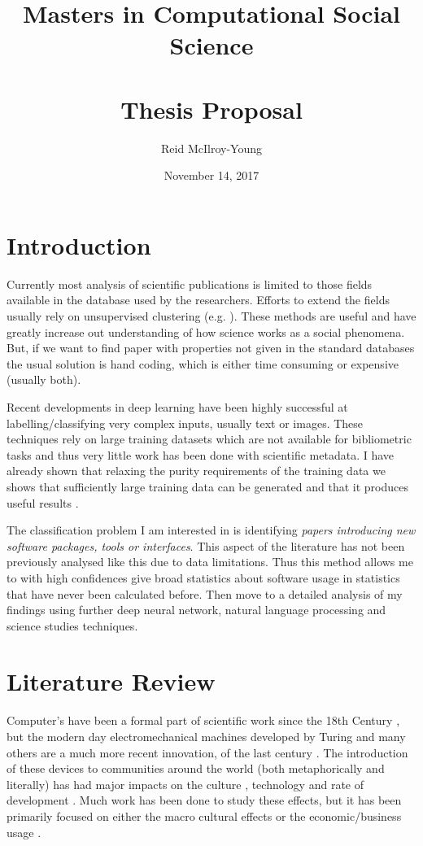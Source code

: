 \documentclass[12pt, a4paper]{article}
\author{Reid McIlroy-Young}
\title{Masters in Computational Social Science\\ \quad \\ \large Thesis Proposal}
\date{November 14, 2017}
\begin{document}
\maketitle
\newpage
{}
\setcounter{page}{1}
\section{Introduction}

Currently most analysis of scientific publications is limited to those fields available in the database used by the researchers. Efforts to extend the fields usually rely on unsupervised clustering (e.g. \cite{Boyack2005}). These methods are useful and have greatly increase out understanding of how science works as a social phenomena. But, if we want to find paper with properties not given in the standard databases the usual solution is hand coding, which is either time consuming or expensive (usually both).

Recent developments in deep learning \citep{karpathy2015deep} have been highly successful at labelling/classifying very complex inputs, usually text or images. These techniques rely on large training datasets which are not available for bibliometric tasks and thus very little work has been done with scientific metadata. I have already shown that relaxing the purity requirements of the training data we shows that sufficiently large training data can be generated and that it produces useful results \citep{mcilroy2017novel}.

The classification problem I am interested in is identifying \textit{papers introducing new software packages, tools or interfaces}. This aspect of the literature has not been previously analysed like this due to data limitations. Thus this method allows me to with high confidences give broad statistics about software usage in statistics that have never been calculated before. Then move to a detailed analysis of my findings using further deep neural network, natural language processing and science studies techniques. 


\section{Literature Review}

Computer's have been a formal part of scientific work since the 18th Century \citep{grier2013computers}, but the modern day electromechanical machines developed by Turing \citep{turing1937computable} and many others \citep{abbate2012recoding}\citep{abbate2000inventing} are a much more recent innovation, of the last century \citep{bauer1972software}.  The introduction of these devices to communities around the world (both metaphorically and literally) has had major impacts on the culture \citep{lessig2007code}, technology\citep{abbate2000inventing} and rate of development \citep{bauer1972software}. Much work has been done to study these effects, but it has been primarily focused on either the macro cultural effects \citep{pfaffenberger1988social} or the economic/business usage \citep{landauer1995trouble}. 
\end{document}
